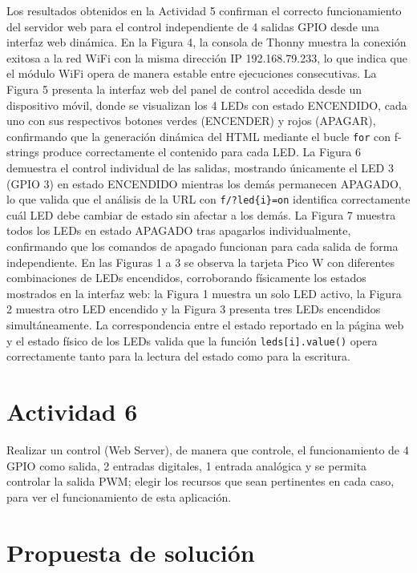 \documentclass[letterpaper,12pt]{article}
\begin{document}
    Los resultados obtenidos en la Actividad 5 confirman el correcto funcionamiento del servidor web para el control independiente de 4 salidas GPIO desde una interfaz web dinámica. En la Figura 4, la consola de Thonny muestra la conexión exitosa a la red WiFi con la misma dirección IP 192.168.79.233, lo que indica que el módulo WiFi opera de manera estable entre ejecuciones consecutivas. La Figura 5 presenta la interfaz web del panel de control accedida desde un dispositivo móvil, donde se visualizan los 4 LEDs con estado ENCENDIDO, cada uno con sus respectivos botones verdes (ENCENDER) y rojos (APAGAR), confirmando que la generación dinámica del HTML mediante el bucle \texttt{for} con f-strings produce correctamente el contenido para cada LED. La Figura 6 demuestra el control individual de las salidas, mostrando únicamente el LED 3 (GPIO 3) en estado ENCENDIDO mientras los demás permanecen APAGADO, lo que valida que el análisis de la URL con \texttt{f\textquotedbl/?led\{i\}=on\textquotedbl} identifica correctamente cuál LED debe cambiar de estado sin afectar a los demás. La Figura 7 muestra todos los LEDs en estado APAGADO tras apagarlos individualmente, confirmando que los comandos de apagado funcionan para cada salida de forma independiente. En las Figuras 1 a 3 se observa la tarjeta Pico W con diferentes combinaciones de LEDs encendidos, corroborando físicamente los estados mostrados en la interfaz web: la Figura 1 muestra un solo LED activo, la Figura 2 muestra otro LED encendido y la Figura 3 presenta tres LEDs encendidos simultáneamente. La correspondencia entre el estado reportado en la página web y el estado físico de los LEDs valida que la función \texttt{leds[i].value()} opera correctamente tanto para la lectura del estado como para la escritura. 
\newpage

\section*{Actividad 6}

    \noindent Realizar un control (Web Server), de manera que controle, el funcionamiento de 4 GPIO como salida, 2 entradas digitales, 1 entrada analógica y se permita controlar la salida PWM; elegir los recursos que sean pertinentes en cada caso, para ver el funcionamiento de esta aplicación.

    \section*{Propuesta de solución}
\end{document}
